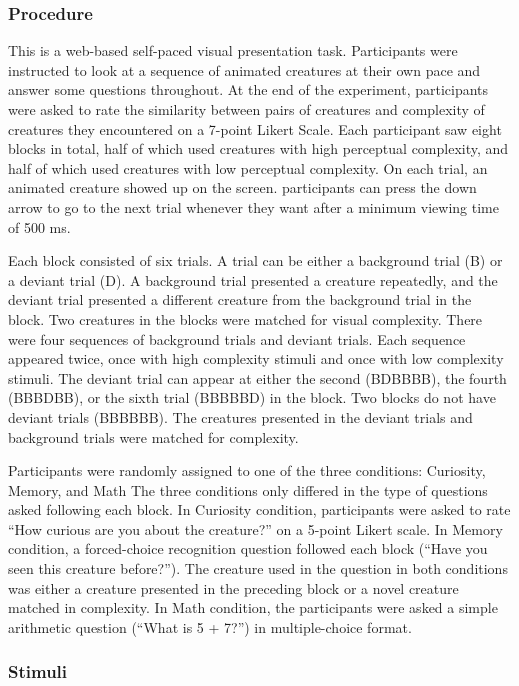 \documentclass[10pt, letterpaper]{article}
\begin{document}
\hypertarget{procedure}{%
\subsubsection{Procedure}\label{procedure}}

This is a web-based self-paced visual presentation task. Participants
were instructed to look at a sequence of animated creatures at their own
pace and answer some questions throughout. At the end of the experiment,
participants were asked to rate the similarity between pairs of
creatures and complexity of creatures they encountered on a 7-point
Likert Scale. Each participant saw eight blocks in total, half of which
used creatures with high perceptual complexity, and half of which used
creatures with low perceptual complexity. On each trial, an animated
creature showed up on the screen. participants can press the down arrow
to go to the next trial whenever they want after a minimum viewing time
of 500 ms.

Each block consisted of six trials. A trial can be either a background
trial (B) or a deviant trial (D). A background trial presented a
creature repeatedly, and the deviant trial presented a different
creature from the background trial in the block. Two creatures in the
blocks were matched for visual complexity. There were four sequences of
background trials and deviant trials. Each sequence appeared twice, once
with high complexity stimuli and once with low complexity stimuli. The
deviant trial can appear at either the second (BDBBBB), the fourth
(BBBDBB), or the sixth trial (BBBBBD) in the block. Two blocks do not
have deviant trials (BBBBBB). The creatures presented in the deviant
trials and background trials were matched for complexity.

Participants were randomly assigned to one of the three conditions:
Curiosity, Memory, and Math The three conditions only differed in the
type of questions asked following each block. In Curiosity condition,
participants were asked to rate ``How curious are you about the
creature?'' on a 5-point Likert scale. In Memory condition, a
forced-choice recognition question followed each block (``Have you seen
this creature before?''). The creature used in the question in both
conditions was either a creature presented in the preceding block or a
novel creature matched in complexity. In Math condition, the
participants were asked a simple arithmetic question (``What is 5 +
7?'') in multiple-choice format.

\hypertarget{stimuli}{%
\subsubsection{Stimuli}\label{stimuli}}
\end{document}

